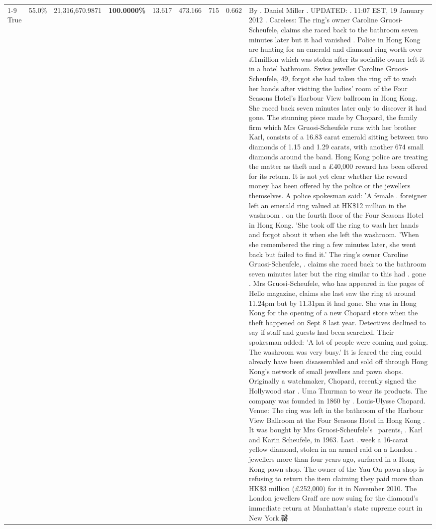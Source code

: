 \begin{table}[H]
\begin{tabular}{lllrlllll}
\cline{1-9}
True & 55.0\% & 21,316,670.9871 & \bfseries \color{red} 100.0000\% & 13.617 & 473.166 & 715 & 0.662 & By . Daniel Miller . UPDATED: . 11:07 EST, 19 January 2012 . Careless: The ring's owner Caroline Gruosi-Scheufele, claims she raced back to the bathroom seven minutes later but it had vanished . Police in Hong Kong are hunting for an emerald and diamond ring worth over £1million which was stolen after its socialite owner left it in a hotel bathroom. Swiss jeweller Caroline Gruosi-Scheufele, 49, forgot she had taken the ring off to wash her hands after visiting the ladies' room of the Four Seasons Hotel's Harbour View ballroom in Hong Kong. She raced back seven minutes later only to discover it had gone. The stunning piece made by Chopard, the family firm which Mrs Gruosi-Scheufele runs with her brother Karl, consists of a 16.83 carat emerald sitting between two diamonds of 1.15 and 1.29 carats, with another 674 small diamonds around the band. Hong Kong police are treating the matter as theft and a £40,000 reward has been offered for its return. It is not yet clear whether the reward money has been offered by the police or the jewellers themselves. A police spokesman said: 'A female . foreigner left an emerald ring valued at HK\$12 million in the washroom . on the fourth floor of the Four Seasons Hotel in Hong Kong. 'She took off the ring to wash her hands and forgot about it when she left the washroom. 'When she remembered the ring a few minutes later, she went back but failed to find it.' The ring's owner Caroline Gruosi-Scheufele, . claims she raced back to the bathroom seven minutes later but the ring similar to this had . gone . Mrs Gruosi-Scheufele, who has appeared in the pages of Hello magazine, claims she last saw the ring at around 11.24pm but by 11.31pm it had gone. She was in Hong Kong for the opening of a new Chopard store when the theft happened on Sept 8 last year. Detectives declined to say if staff and guests had been searched. Their spokesman added: 'A lot of people were coming and going. The washroom was very busy.' It is feared the ring could already have been disassembled and sold off through Hong Kong's network of small jewellers and pawn shops. Originally a watchmaker, Chopard, recently signed the Hollywood star . Uma Thurman to wear its products. The company was founded in 1860 by . Louis-Ulysse Chopard. Venue: The ring was left in the bathroom of the Harbour View Ballroom at the Four Seasons Hotel in Hong Kong . It was bought by Mrs Gruosi-Scheufele's  parents, . Karl and Karin Scheufele, in 1963. Last . week a 16-carat yellow diamond, stolen in an armed raid on a London . jewellers more than four years ago, surfaced in a Hong Kong pawn shop. The owner of the Yau On pawn shop is refusing to return the item claiming they paid more than HK\$3 million (£252,000) for it in November 2010. The London jewellers Graff are now suing for the diamond’s immediate return at Manhattan’s state supreme court in New York.罄 \\

\end{tabular}
\end{table}
